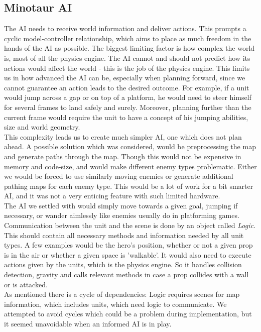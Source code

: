 \subsection{Minotaur AI} %
The AI needs to receive world information and deliver actions. This prompts a cyclic model-controller relationship, which aims to place as much freedom in the hands of the AI as possible. The biggest limiting factor is how complex the world is, most of all the physics engine. The AI cannot and should not predict how its actions would affect the world - this is the job of the physics engine. This limits us in how advanced the AI can be, especially when planning forward, since we cannot guarantee an action leads to the desired outcome. For example, if a unit would jump across a gap or on top of a platform, he would need to steer himself for several frames to land safely and surely. Moreover, planning further than the current frame would require the unit to have a concept of his jumping abilities, size and world geometry.\\
This complexity leads us to create much simpler AI, one which does not plan ahead. A possible solution which was considered, would be preprocessing the map and generate paths through the map. Though this would not be expensive in memory and code-size, and would make different enemy types problematic. Either we would be forced to use similarly moving enemies or generate additional pathing maps for each enemy type. This would be a lot of work for a bit smarter AI, and it was not a very enticing feature with such limited hardware.\\
The AI we settled with would simply move towards a given goal, jumping if necessary, or wander aimlessly like enemies usually do in platforming games.\\
Communication between the unit and the scene is done by an object called \emph{Logic}. This should contain all necessary methods and information needed by all unit types. A few examples would be the hero's position, whether or not a given prop is in the air or whether a given space is 'walkable'. It would also need to execute actions given by the units, which is the physics engine. So it handles collision detection, gravity and calls relevant methods in case a prop collides with a wall or is attacked.\\
As mentioned there is a cycle of dependencies: Logic requires scenes for map information, which includes units, which need logic to communicate. We attempted to avoid cycles which could be a problem during implementation, but it seemed unavoidable when an informed AI is in play.

